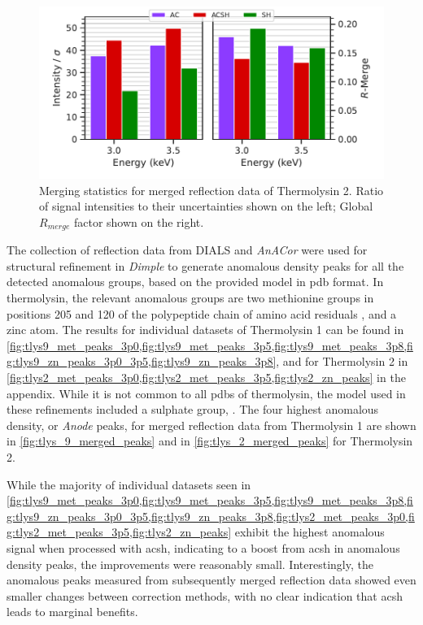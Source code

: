 \begin{figure}
    \centering
    \includegraphics{plots/exp1/tlys_2_P6122/merged_stats.pdf}
    \caption{Merging statistics for merged reflection data of Thermolysin 2. Ratio of signal intensities to their uncertainties shown on the left; Global $R_{merge}$ factor shown on the right.}
    \label{fig:tlys_2_stats}
\end{figure}


The collection of reflection data from DIALS and \textit{AnACor} were used for structural refinement in \textit{Dimple} to generate anomalous density peaks for all the detected anomalous groups, based on the provided model in \ac{pdb} format. In thermolysin, the relevant anomalous groups are two methionine groups in positions 205 and 120 of the polypeptide chain of amino acid residuals %
, and a zinc atom. The results for individual datasets of Thermolysin 1 can be found in \cref{fig:tlys9_met_peaks_3p0,fig:tlys9_met_peaks_3p5,fig:tlys9_met_peaks_3p8,fig:tlys9_zn_peaks_3p0_3p5,fig:tlys9_zn_peaks_3p8}, and for Thermolysin 2 in \cref{fig:tlys2_met_peaks_3p0,fig:tlys2_met_peaks_3p5,fig:tlys2_zn_peaks} in the appendix. %
While it is not common to all \ac{pdb}s of thermolysin, the model used in these refinements included a sulphate group, . The four highest anomalous density, or \textit{Anode} peaks, for merged reflection data from Thermolysin 1 are shown in \cref{fig:tlys_9_merged_peaks} and in \cref{fig:tlys_2_merged_peaks} for Thermolysin 2.


While the majority of individual datasets seen in \cref{fig:tlys9_met_peaks_3p0,fig:tlys9_met_peaks_3p5,fig:tlys9_met_peaks_3p8,fig:tlys9_zn_peaks_3p0_3p5,fig:tlys9_zn_peaks_3p8,fig:tlys2_met_peaks_3p0,fig:tlys2_met_peaks_3p5,fig:tlys2_zn_peaks} exhibit the highest anomalous signal when processed with \ac{acsh}, indicating to a boost from \ac{acsh} in anomalous density peaks, the improvements were reasonably small. Interestingly, the anomalous peaks measured from subsequently merged reflection data showed even smaller changes between correction methods, with no clear indication that \ac{acsh} leads to marginal benefits.


